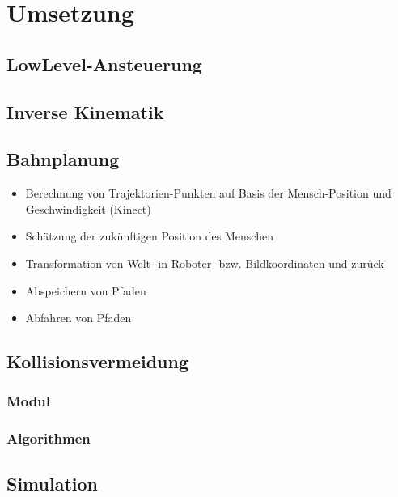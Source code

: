 \section{Umsetzung}


\subsection{LowLevel-Ansteuerung}
\authorsection{\editoroier}


\subsection{Inverse Kinematik}
\authorsection{\editorjulian}


\subsection{Bahnplanung}
\authorsection{\editortobias}

\begin{itemize}
	\item  Berechnung von Trajektorien-Punkten auf Basis der Mensch-Position und Geschwindigkeit (Kinect)
	\item Schätzung der zukünftigen Position des Menschen
	\item Transformation von Welt- in Roboter- bzw. Bildkoordinaten und zurück
	\item Abspeichern von Pfaden
	\item Abfahren von Pfaden
\end{itemize}


\subsection{Kollisionsvermeidung}

\subsubsection{Modul}
\authorsection{\editortobias}

\subsubsection{Algorithmen}
\authorsection{\editorjulian}


\subsection{Simulation}
\authorsection{\editoroier}

